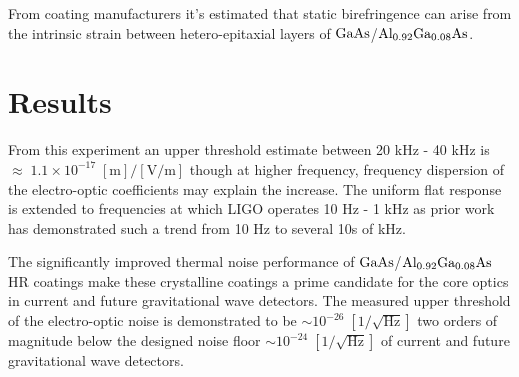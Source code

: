 From coating manufacturers it's estimated that static birefringence can arise from the intrinsic strain between hetero-epitaxial layers of $\mathrm{GaAs}$/$\mathrm{Al_{0.92}Ga_{0.08}As}$. \cite{cole:2013, adachi:1985}

\section{Results}

From this experiment an upper threshold estimate between 20 kHz - 40 kHz is $\approx \; 1.1 \times 10^{-17} \; [\mathrm{m}]/[\mathrm{V}/\mathrm{m}]$ though at higher frequency, frequency dispersion of the electro-optic coefficients may explain the increase.  The uniform flat response is extended to frequencies at which LIGO operates 10 Hz - 1 kHz as prior work has demonstrated such a trend from 10 Hz to several 10s of kHz.

The significantly improved thermal noise performance of $\mathrm{GaAs}$/$\mathrm{Al_{0.92}Ga_{0.08}As}$ HR coatings make these crystalline coatings a prime candidate for the core optics in current and future gravitational wave detectors. The measured upper threshold of the electro-optic noise is demonstrated to be $\sim 10^{-26} \; [1/\sqrt{\mathrm{Hz}}]$ two orders of magnitude below the designed noise floor $\sim 10^{-24}\; [1/\sqrt{\mathrm{Hz}}]$ of current and future gravitational wave detectors.

